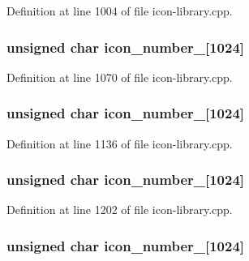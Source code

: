 Definition at line 1004 of file icon-\/library.cpp.

\hypertarget{icon-library_8cpp_ac3d10832f5f5327f04c10fb22a4b4d99}{
\subsubsection[{icon\_\-number\_\-4}]{\setlength{\rightskip}{0pt plus 5cm}unsigned char {\bf icon\_\-number\_}\mbox{[}1024\mbox{]}}}
\label{icon-library_8cpp_ac3d10832f5f5327f04c10fb22a4b4d99}


Definition at line 1070 of file icon-\/library.cpp.

\hypertarget{icon-library_8cpp_a261f479117fb05bbe64fba0111a30fed}{
\subsubsection[{icon\_\-number\_\-5}]{\setlength{\rightskip}{0pt plus 5cm}unsigned char {\bf icon\_\-number\_}\mbox{[}1024\mbox{]}}}
\label{icon-library_8cpp_a261f479117fb05bbe64fba0111a30fed}


Definition at line 1136 of file icon-\/library.cpp.

\hypertarget{icon-library_8cpp_a9e8fd90cd27a2ecd801d93ae56eb734c}{
\subsubsection[{icon\_\-number\_\-6}]{\setlength{\rightskip}{0pt plus 5cm}unsigned char {\bf icon\_\-number\_}\mbox{[}1024\mbox{]}}}
\label{icon-library_8cpp_a9e8fd90cd27a2ecd801d93ae56eb734c}


Definition at line 1202 of file icon-\/library.cpp.

\hypertarget{icon-library_8cpp_a52e626c8ba6cf28abff3b5c96b14dea9}{
\subsubsection[{icon\_\-number\_\-7}]{\setlength{\rightskip}{0pt plus 5cm}unsigned char {\bf icon\_\-number\_}\mbox{[}1024\mbox{]}}}
\label{icon-library_8cpp_a52e626c8ba6cf28abff3b5c96b14dea9}



